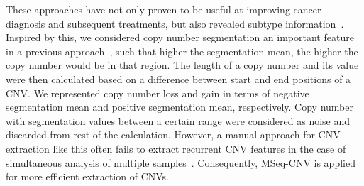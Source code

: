 
\hspace*{3.5mm} These approaches have not only proven to be useful at improving cancer diagnosis and subsequent treatments, but also revealed subtype information~\cite{66Huang}. Inspired by this, we considered copy number segmentation an important feature in a previous approach~\cite{karim2018a2ic}, such that higher the segmentation mean, the higher the copy number would be in that region. The length of a copy number and its value were then calculated based on a difference between start and end positions of a CNV. We represented copy number loss and gain in terms of negative segmentation mean and positive segmentation mean, respectively. Copy number with segmentation values between a certain range were considered as noise and discarded from rest of the calculation. However, a manual approach for CNV extraction like this often fails to extract recurrent CNV features in the case of simultaneous analysis of multiple samples~\cite{malekpour2018mseq}. Consequently, MSeq-CNV is applied for more efficient extraction of CNVs. 

